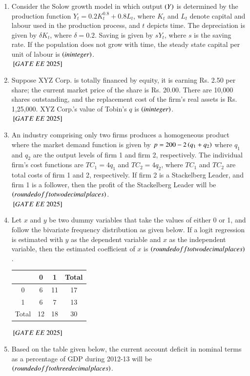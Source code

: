 \documentclass[journal,12pt,onecolumn]{IEEEtran}
\theoremstyle{remark}
\begin{document}
\begin{enumerate}
\item Consider the Solow growth model in which output $\left(Y\right)$ is determined by the production function $Y_t = 0.2 K_t^{0.8} + 0.8 L_t$, where $K_t$ and $L_t$ denote capital and labour used in the production process, and $t$ depicts time. The depreciation is given by $\delta K_t$, where $\delta = 0.2$. Saving is given by $sY_t$, where $s$ is the saving rate. If the population does not grow with time, the steady state capital per unit of labour is \underline{\hspace{2cm}} $\left(in integer\right)$.\\
${}\left[GATE\ EE\ 2025\right]$\\
\item Suppose XYZ Corp. is totally financed by equity, it is earning Rs. 2.50 per share; the current market price of the share is Rs. 20.00. There are 10,000 shares outstanding, and the replacement cost of the firm's real assets is Rs. 1,25,000. XYZ Corp.'s value of Tobin's $q$ is \underline{\hspace{2cm}} $\left(in integer\right)$.\\
 ${}\left[GATE\ EE\ 2025\right]$\\
\item An industry comprising only two firms produces a homogeneous product where the market demand function is given by $p = 200 - 2\left(q_1 + q_2\right)$ where $q_1$ and $q_2$ are the output levels of firm 1 and firm 2, respectively. The individual firm's cost functions are $TC_1 = 4q_1$ and $TC_2 = 4q_2$, where $TC_1$ and $TC_2$ are total costs of firm 1 and 2, respectively. If firm 2 is a Stackelberg Leader, and firm 1 is a follower, then the profit of the Stackelberg Leader will be \underline{\hspace{2cm}} $\left(rounded off to two decimal places\right)$.\\
 ${}\left[GATE\ EE\ 2025\right]$\\
\item Let $x$ and $y$ be two dummy variables that take the values of either 0 or 1, and follow the bivariate frequency distribution as given below. If a logit regression is estimated with $y$ as the dependent variable and $x$ as the independent variable, then the estimated coefficient of $x$ is \underline{\hspace{2cm}} $\left(rounded off to two decimal places\right)$.

\begin{center}
\begin{tabular}{|c|c|c|c|}
\hline
 & 0 & 1 & Total \\
\hline
0 & 6 & 11 & 17 \\
1 & 6 & 7 & 13 \\
\hline
Total & 12 & 18 & 30 \\
\hline
\end{tabular}
\end{center}
 ${}\left[GATE\ EE\ 2025\right]$\\
\item Based on the table given below, the current account deficit in nominal terms as a percentage of GDP during 2012-13 will be \underline{\hspace{2cm}} $\left(rounded off to three decimal places\right)$.


\end{enumerate}
\end{document}
